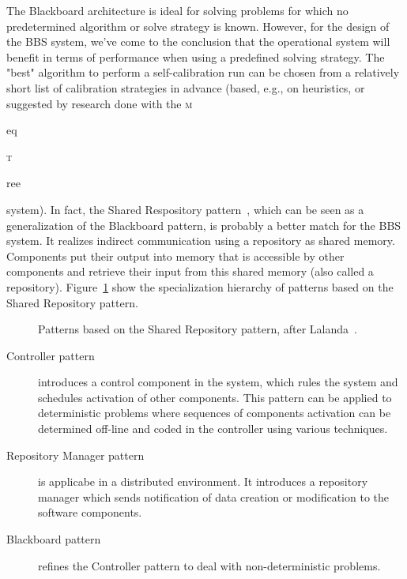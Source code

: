 \documentclass[10pt]{lofar}
\newcommand{\meqtree}{\textsc{m}\begin{footnotesize}eq\end{footnotesize}\textsc{t}\begin{footnotesize}ree\end{footnotesize}\xspace}
\begin{document}
The Blackboard architecture is ideal for solving problems for which no
predetermined algorithm or solve strategy is known. However, for the design of
the BBS system, we've come to the conclusion that the operational system will
benefit in terms of performance when using a predefined solving strategy. The
"best" algorithm to perform a self-calibration run can be chosen from a
relatively short list of calibration strategies in advance (based, e.g., on
heuristics, or suggested by research done with the \meqtree system).  In fact,
the Shared Respository pattern~\cite{Lalanda1998}, which can be seen as a
generalization of the Blackboard pattern, is probably a better match for the
BBS system. It realizes indirect communication using a repository as shared
memory. Components put their output into memory that is accessible by other
components and retrieve their input from this shared memory (also called a
repository). Figure~\ref{fig:shared-repository-pattern} show the
specialization hierarchy of patterns based on the Shared Repository pattern.

\begin{figure}[!ht]
\centering
{}
\caption{Patterns based on the Shared Repository pattern, after
Lalanda~\cite{Lalanda1998}.}
\label{fig:shared-repository-pattern}
\end{figure}

\begin{description}
\item [Controller pattern] introduces a control component in the system, which
rules the system and schedules activation of other components. This pattern
can be applied to deterministic problems where sequences of components
activation can be determined off-line and coded in the controller using
various techniques.
\item[Repository Manager pattern] is applicabe in a distributed
environment. It introduces a repository manager which sends notification of
data creation or modification to the software components.
\item[Blackboard pattern] refines the Controller pattern to deal with
non-deterministic problems.
\end{description}
\end{document}
